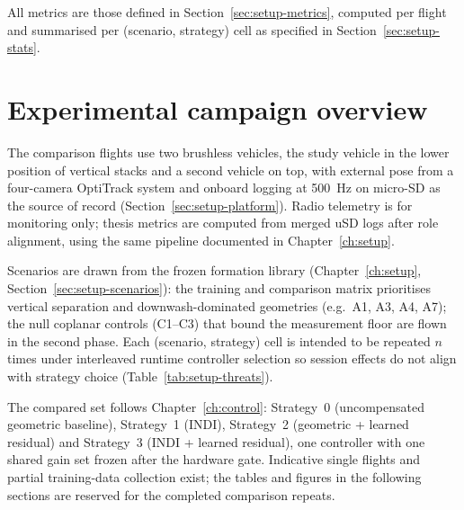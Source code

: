 All metrics are those defined in Section~\ref{sec:setup-metrics}, computed per flight and summarised
per (scenario, strategy) cell as specified in Section~\ref{sec:setup-stats}.

\section{Experimental campaign overview}
\label{sec:res2-overview}

The comparison flights use two brushless vehicles, the study vehicle in the lower position of
vertical stacks and a second vehicle on top, with external pose from a four-camera OptiTrack system and
onboard logging at \SI{500}{\hertz} on micro-SD as the source of record (Section~\ref{sec:setup-platform}).
Radio telemetry is for monitoring only; thesis metrics are computed from merged uSD logs after role
alignment, using the same pipeline documented in Chapter~\ref{ch:setup}.

Scenarios are drawn from the frozen formation library (Chapter~\ref{ch:setup}, Section~\ref{sec:setup-scenarios}):
the training and comparison matrix prioritises vertical separation and downwash-dominated geometries (e.g.\ A1,
A3, A4, A7); the null coplanar controls (C1--C3) that bound the measurement floor are flown in the
second phase. Each
(scenario, strategy) cell is intended to be repeated $n$ times under interleaved runtime controller
selection so session effects do not align with strategy choice (Table~\ref{tab:setup-threats}).

The compared set follows Chapter~\ref{ch:control}: Strategy~0 (uncompensated geometric baseline),
Strategy~1 (INDI), Strategy~2 (geometric + learned residual) and Strategy~3 (INDI + learned
residual), one controller with one shared gain set frozen after the hardware gate.
Indicative single flights and partial training-data collection
exist; the tables and figures in the following sections are reserved for the completed comparison repeats.


